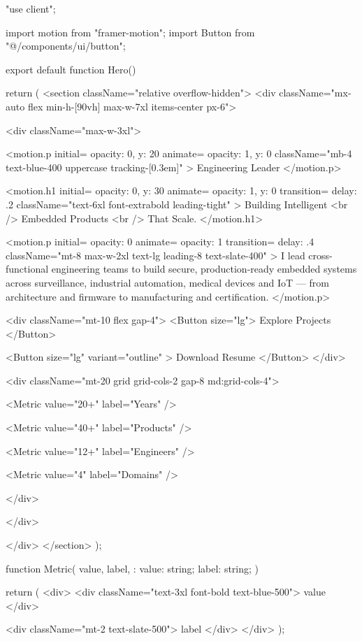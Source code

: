"use client";

import { motion } from "framer-motion";
import { Button } from "@/components/ui/button";

export default function Hero() {
  return (
    <section className="relative overflow-hidden">
      <div className="mx-auto flex min-h-[90vh] max-w-7xl items-center px-6">

        <div className="max-w-3xl">

          <motion.p
            initial={{ opacity: 0, y: 20 }}
            animate={{ opacity: 1, y: 0 }}
            className="mb-4 text-blue-400 uppercase tracking-[0.3em]"
          >
            Engineering Leader
          </motion.p>

          <motion.h1
            initial={{ opacity: 0, y: 30 }}
            animate={{ opacity: 1, y: 0 }}
            transition={{ delay: .2 }}
            className="text-6xl font-extrabold leading-tight"
          >
            Building Intelligent
            <br />
            Embedded Products
            <br />
            That Scale.
          </motion.h1>

          <motion.p
            initial={{ opacity: 0 }}
            animate={{ opacity: 1 }}
            transition={{ delay: .4 }}
            className="mt-8 max-w-2xl text-lg leading-8 text-slate-400"
          >
            I lead cross-functional engineering teams to build secure,
            production-ready embedded systems across surveillance,
            industrial automation, medical devices and IoT —
            from architecture and firmware to manufacturing
            and certification.
          </motion.p>

          <div className="mt-10 flex gap-4">
            <Button size="lg">
              Explore Projects
            </Button>

            <Button
              size="lg"
              variant="outline"
            >
              Download Resume
            </Button>
          </div>

          <div className="mt-20 grid grid-cols-2 gap-8 md:grid-cols-4">

            <Metric
              value="20+"
              label="Years"
            />

            <Metric
              value="40+"
              label="Products"
            />

            <Metric
              value="12+"
              label="Engineers"
            />

            <Metric
              value="4"
              label="Domains"
            />

          </div>

        </div>

      </div>
    </section>
  );
}

function Metric({
  value,
  label,
}: {
  value: string;
  label: string;
}) {
  return (
    <div>
      <div className="text-3xl font-bold text-blue-500">
        {value}
      </div>

      <div className="mt-2 text-slate-500">
        {label}
      </div>
    </div>
  );
}